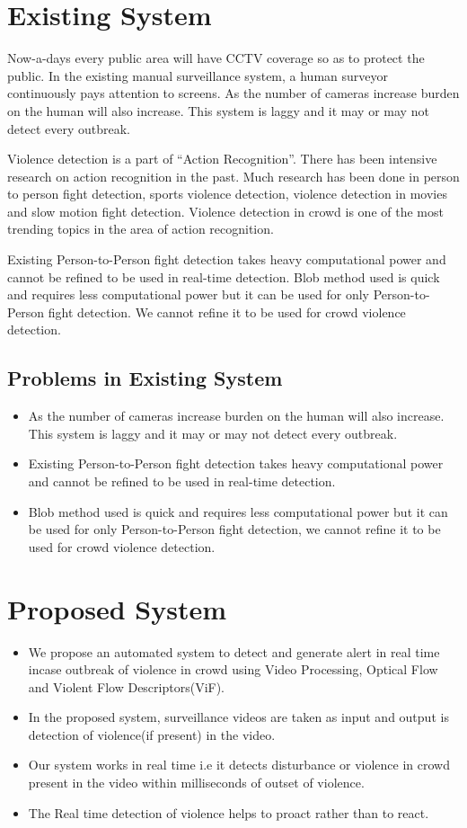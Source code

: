\section{Existing System}
Now-a-days every public area will have CCTV coverage so as to protect the public. In the existing manual surveillance system, a human surveyor continuously pays attention to screens. As the number of cameras increase burden on the human will also increase. This system is laggy and it may or may not detect every outbreak. 
\par
Violence detection is a part of “Action Recognition”. There has been intensive research on action recognition in the past. Much research has been done in person to person fight detection, sports violence detection, violence detection in movies and slow motion fight detection. Violence detection in crowd is one of the most trending topics in the area of action recognition. 
\par
Existing Person-to-Person fight detection takes heavy computational power and cannot be refined to be used in real-time detection. Blob method used is quick and requires less computational power but it can be used for only Person-to-Person fight detection. We cannot refine it to be used for crowd violence detection.
\subsection{Problems in Existing System}
\begin{itemize}
	\item As the number of cameras increase burden on the human will also increase. This system is laggy and it may or may not detect every outbreak.
	\item Existing Person-to-Person fight detection takes heavy computational power and cannot be refined to be used in real-time detection.
	\item Blob method used is quick and requires less computational power but it can be used for only Person-to-Person fight detection, we cannot refine it to be used for crowd violence detection.
\end{itemize}
\section{Proposed System}
\begin{itemize}
  \item We propose an automated system to detect and generate alert in real time incase outbreak of violence in crowd using Video Processing, Optical Flow and Violent Flow Descriptors(ViF). 
  \item In the proposed system, surveillance videos are taken as input and output is detection of violence(if present) in the video.
  \item Our system works in real time i.e it detects disturbance or violence in crowd present in the video within milliseconds of outset of violence. 
  \item The Real time detection of violence helps to proact rather than to react.
\end{itemize}
